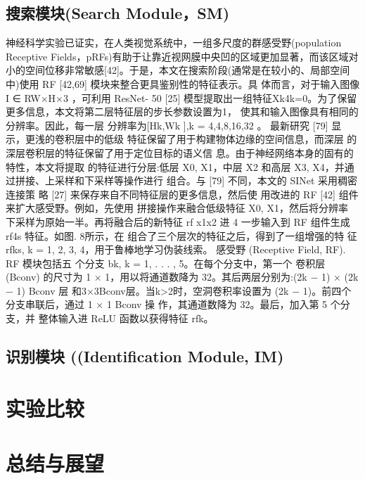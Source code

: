 \documentclass[final]{cvpr}
\begin{document}
\subsection{搜索模块(Search Module，SM)}
神经科学实验已证实，在人类视觉系统中，一组多尺度的群感受野(population Receptive Fields，pRFs)有助于让靠近视网膜中央凹的区域更加显著，而该区域对小的空间位移非常敏感[42]。于是，本文在搜索阶段(通常是在较小的、局部空间中)使用 RF [42,69] 模块来整合更具鉴别性的特征表示。具 体而言，对于输入图像 I ∈ RW×H×3 ，可利用 ResNet- 50 [25] 模型提取出一组特征{Xk}4k=0。为了保留更多信息，本文将第二层特征层的步长参数设置为1， 使其和输入图像具有相同的分辨率。因此，每一层 分辨率为{[Hk,Wk ],k = 4,4,8,16,32} 。
最新研究 [79] 显示，更浅的卷积层中的低级
特征保留了用于构建物体边缘的空间信息，而深层
的深层卷积层的特征保留了用于定位目标的语义信
息。由于神经网络本身的固有的特性，本文将提取
的特征进行分层:低层 {X0, X1}，中层 X2 和高层
{X3, X4}，并通过拼接、上采样和下采样等操作进行
组合。与 [79] 不同，本文的 SINet 采用稠密连接策
略 [27] 来保存来自不同特征层的更多信息，然后使
用改进的 RF [42] 组件来扩大感受野。例如，先使用
拼接操作来融合低级特征 {X0, X1}，然后将分辨率
下采样为原始一半。再将融合后的新特征 rf x1x2 进 4
一步输入到 RF 组件生成 rf4s 特征。如图. 8所示，在
组合了三个层次的特征之后，得到了一组增强的特 征 {rfks, k = 1, 2, 3, 4}，用于鲁棒地学习伪装线索。 感受野 (Receptive Field, RF). RF 模块包括五 个分支 {bk, k = 1, . . . , 5}。在每个分支中，第一个 卷积层 (Bconv) 的尺寸为 1 × 1，用以将通道数降为 32。其后两层分别为:(2k − 1) × (2k − 1) Bconv 层 和3×3Bconv层。当k>2时，空洞卷积率设置为 (2k − 1)。前四个分支串联后，通过 1 × 1 Bconv 操 作，其通道数降为 32。最后，加入第 5 个分支，并 整体输入进 ReLU 函数以获得特征 rfk。


\subsection{识别模块 ((Identification Module, IM)}
\section{实验比较}\label{sec:Experiment}




\section{总结与展望}\label{sec:Conclusion}




% 
% 

\end{document}
